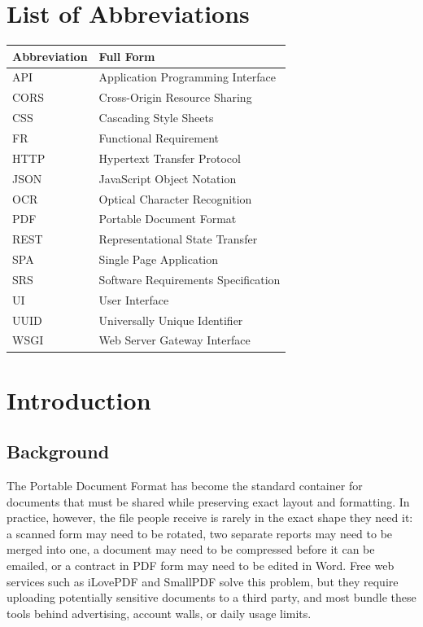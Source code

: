 \documentclass[12pt,a4paper]{report}
\begin{document}
\chapter*{List of Abbreviations}
\begin{table}[h]
\centering
\begin{tabular}{@{}ll@{}}
\toprule
\textbf{Abbreviation} & \textbf{Full Form} \\
\midrule
API & Application Programming Interface \\
CORS & Cross-Origin Resource Sharing \\
CSS & Cascading Style Sheets \\
FR & Functional Requirement \\
HTTP & Hypertext Transfer Protocol \\
JSON & JavaScript Object Notation \\
OCR & Optical Character Recognition \\
PDF & Portable Document Format \\
REST & Representational State Transfer \\
SPA & Single Page Application \\
SRS & Software Requirements Specification \\
UI & User Interface \\
UUID & Universally Unique Identifier \\
WSGI & Web Server Gateway Interface \\
\bottomrule
\end{tabular}
\end{table}

\clearpage
{}

\chapter{Introduction}

\section{Background}
The Portable Document Format has become the standard container for documents that must be
shared while preserving exact layout and formatting. In practice, however, the file people
receive is rarely in the exact shape they need it: a scanned form may need to be rotated, two
separate reports may need to be merged into one, a document may need to be compressed before it
can be emailed, or a contract in PDF form may need to be edited in Word. Free web services such
as iLovePDF and SmallPDF solve this problem, but they require uploading potentially sensitive
documents to a third party, and most bundle these tools behind advertising, account walls, or
daily usage limits.
\end{document}
